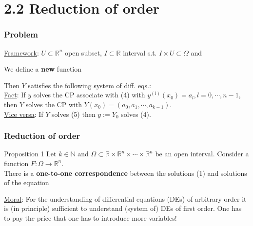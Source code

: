 \documentclass[10pt]{beamer}
\newcommand{\R}{\mathbb{R}}
\newcommand{\N}{\mathbb{N}}
\begin{document}
{\section{2.2 Reduction of order}

\begin{frame} \frametitle{Problem}
\underline{Framework}: $U \subset \R^n$ open subset, $I \subset \R$ interval s.t. $I \times U \subset \Omega$ and
\begin{block}{}
\vspace{0.4cm}
\end{block}
We define a \textbf{new} function 
\begin{block}{}
\vspace{0.4cm}
\end{block}
Then $Y$ satisfies the following system of diff. eqs.:\\
\vspace{3cm}
\underline{Fact}: If $y$ solves the CP associate with (4) with $y^{(l)}(x_0)=a_l, l=0, \cdots, n-1$, \\
then $Y$ solves the CP with $Y(x_0)=(a_0, a_1, \cdots, a_{k-1})$.\\
\underline{Vice versa}: If $Y$ solves (5) then $y:=Y_0$ solves (4).
\end{frame}

\begin{frame} \frametitle{Reduction of order}
\begin{block}{Proposition 1}
Let $k\in \N$ and $\Omega \subset \R \times \R^n \times \cdots \times \R^n$ be an open interval. Consider a function $F: \Omega \rightarrow \R^n$.\\
There is a \textbf{one-to-one correspondence} between the solutions (1) and solutions of the equation\\
\vspace{2cm}
\end{block}
\vspace{0.2cm}
\underline{Moral}: For the understanding of differential equations (DEs) of arbitrary order it is (in principle) sufficient to understand (system of) DEs of first order. One has to pay the price that one has to introduce more variables!\\
\end{frame}

}
\end{document}
